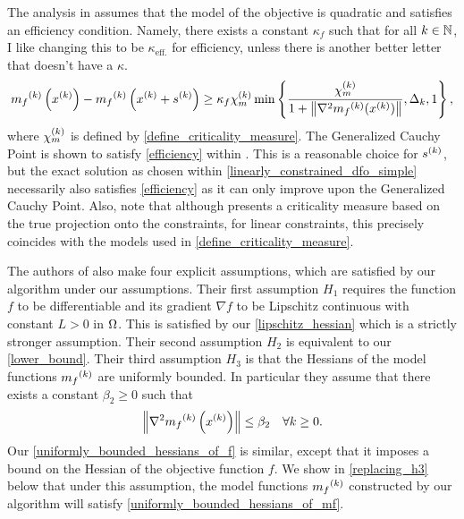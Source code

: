 \documentclass{article}
\begin{document}
The analysis in \cite{Conejo:2013:GCT:2620806.2621814}  assumes that the model of the objective is quadratic and satisfies an efficiency condition.
Namely, there exists a constant $\kappa_f$ such that for all $k \in \mathbb N$,
\color{magenta}
I like changing this to be $\kappa_{\textrm{eff.}}$ for efficiency, unless there is another better letter that doesn't have a $\kappa$.
\color{black}
\begin{align}
\label{efficiency}
{{m}_f}^{(k)}\left(x^{(k)}\right) - {{m}_f}^{(k)}\left(x^{(k)} + {{s}^{(k)}}\right) \ge \kappa_f {\chi_m^{(k)}} \min\left\{ \frac{{\chi_m^{(k)}}}{1+\left\|\nabla^2 {{m}_f}^{(k)}(x^{(k)})\right\|}, \Delta_k, 1 \right\},
\end{align}
where ${\chi_m^{(k)}}$ is defined by \cref{define_criticality_measure}.
The Generalized Cauchy Point is shown to satisfy \cref{efficiency} within \cite{Conn:2000:TM:357813}.
This is a reasonable choice for ${{s}^{(k)}}$, but the exact solution as chosen within \cref{linearly_constrained_dfo_simple} 
necessarily also satisfies \cref{efficiency} as it can only improve upon the Generalized Cauchy Point.
Also, note that although \cite{Conejo:2013:GCT:2620806.2621814} presents a criticality measure based on the true projection onto the constraints,
for linear constraints, this precisely coincides with the models used in \cref{define_criticality_measure}.

The authors of \cite{Conejo:2013:GCT:2620806.2621814} also make four explicit assumptions, which are satisfied by our algorithm under our assumptions.     
Their first assumption $H_1$ requires the function $f$ to be differentiable and its gradient $\nabla f$ to be Lipschitz continuous with constant $L > 0$ in $\Omega$.  This is satisfied by our 
\cref{lipschitz_hessian} which is a strictly stronger assumption.
Their second assumption $H_2$ is equivalent to our \cref{lower_bound}.    Their third assumption $H_3$ is that
the Hessians of the model functions ${{m}_f}^{(k)}$ are uniformly bounded.    In particular they assume that there exists a constant $\beta_2 \ge 0$ such that
\begin{equation}\label{uniformly_bounded_hessians_of_mf}
 \left\|\nabla^2 {{m}_f}^{(k)}\left(x^{(k)}\right)\right\| \le \beta_2 \quad \forall k \ge 0.
 \end{equation}
Our  \cref{uniformly_bounded_hessians_of_f}
 is similar, except that it imposes a bound on the Hessian of the objective function $f$.    We show in \cref{replacing_h3} below that under this assumption,  the model functions ${{m}_f}^{(k)}$ constructed by our algorithm will satisfy \cref{uniformly_bounded_hessians_of_mf}.
\end{document}
